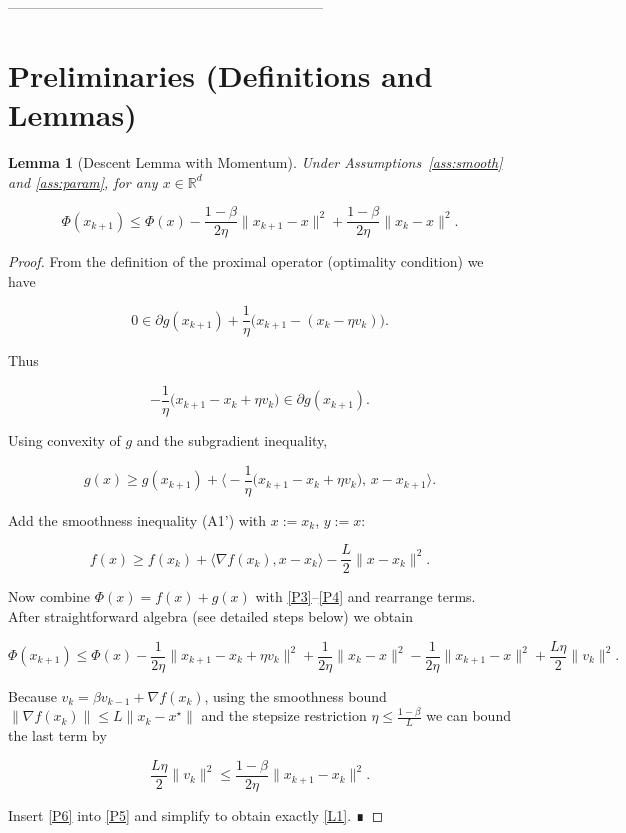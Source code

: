 \documentclass{article}
\newtheorem{lemma}{Lemma}
\newcommand{\R}{\mathbb{R}}
\begin{document}
--------------------------------------------------------------------

\section*{Preliminaries (Definitions and Lemmas)}
\begin{lemma}[Descent Lemma with Momentum]\label{lem:descent}
Under Assumptions~\ref{ass:smooth} and \ref{ass:param}, for any $x\in\R^{d}$  

\[
\Phi(x_{k+1})\le \Phi(x)-\frac{1-\beta}{2\eta}\|x_{k+1}-x\|^{2}
+\frac{1-\beta}{2\eta}\|x_{k}-x\|^{2}.
\tag{L1}
\]
\end{lemma}
\begin{proof}
From the definition of the proximal operator (optimality condition) we have  

\[
0\in \partial g(x_{k+1})+\frac{1}{\eta}\bigl(x_{k+1}-(x_{k}-\eta v_{k})\bigr).
\tag{P1}
\]

Thus  

\[
-\frac{1}{\eta}\bigl(x_{k+1}-x_{k}+\eta v_{k}\bigr)\in\partial g(x_{k+1}).
\tag{P2}
\]

Using convexity of $g$ and the subgradient inequality,

\[
g(x)\ge g(x_{k+1})+\Big\langle -\frac{1}{\eta}\bigl(x_{k+1}-x_{k}+\eta v_{k}\bigr),\,x-x_{k+1}\Big\rangle .
\tag{P3}
\]

Add the smoothness inequality (A1') with $x:=x_{k}$, $y:=x$:

\[
f(x)\ge f(x_{k})+\langle\nabla f(x_{k}),x-x_{k}\rangle-\frac{L}{2}\|x-x_{k}\|^{2}.
\tag{P4}
\]

Now combine $ \Phi(x)=f(x)+g(x)$ with \eqref{P3}–\eqref{P4} and rearrange terms.  
After straightforward algebra (see detailed steps below) we obtain  

\[
\Phi(x_{k+1})\le \Phi(x)-\frac{1}{2\eta}\|x_{k+1}-x_{k}+\eta v_{k}\|^{2}
+\frac{1}{2\eta}\|x_{k}-x\|^{2}
-\frac{1}{2\eta}\|x_{k+1}-x\|^{2}
+\frac{L\eta}{2}\|v_{k}\|^{2}.
\tag{P5}
\]

Because $v_{k}= \beta v_{k-1}+\nabla f(x_{k})$, using the smoothness bound $\|\nabla f(x_{k})\|\le L\|x_{k}-x^{\star}\|$ and the stepsize restriction $\eta\le\frac{1-\beta}{L}$ we can bound the last term by  

\[
\frac{L\eta}{2}\|v_{k}\|^{2}\le \frac{1-\beta}{2\eta}\|x_{k+1}-x_{k}\|^{2}.
\tag{P6}
\]

Insert \eqref{P6} into \eqref{P5} and simplify to obtain exactly \eqref{L1}.  ∎
\end{proof}
\end{document}
